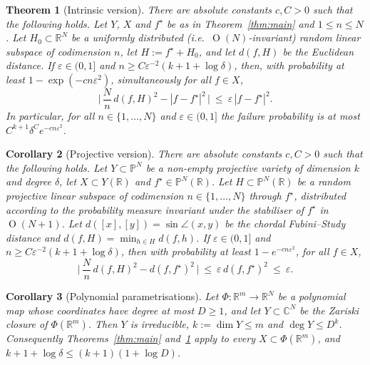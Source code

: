 \documentclass[11pt]{article}
\newtheorem{theorem}{Theorem}[section]
\newtheorem{corollary}[theorem]{Corollary}
\theoremstyle{definition}
\numberwithin{equation}{section}
\newcommand{\R}{\mathbb{R}}
\newcommand{\C}{\mathbb{C}}
\newcommand{\PP}{\mathbb{P}}
\newcommand{\eps}{\varepsilon}
\newcommand{\fs}{f^{\star}}
\DeclareMathOperator{\Ort}{O}
\begin{document}
\begin{theorem}[Intrinsic version]\label{thm:haar}
There are absolute constants $c,C>0$ such that the following holds. Let $Y$, $X$ and $\fs$ be as in Theorem~\ref{thm:main} and $1\le n\le N$. Let $H_0\subset\R^N$ be a uniformly distributed (i.e.\ $\Ort(N)$-invariant) random linear subspace of codimension $n$, let $H:=\fs+H_0$, and let $d(f,H)$ be the Euclidean distance. If $\eps\in(0,1]$ and $n\ge C\eps^{-2}(k+1+\log\delta)$, then, with probability at least $1-\exp(-cn\eps^2)$, simultaneously for all $f\in X$,
\begin{equation}\label{eq:haar}
\Big|\,\frac Nn\,d(f,H)^2-|f-\fs|^2\,\Big|\ \le\ \eps\,|f-\fs|^2 .
\end{equation}
In particular, for all $n\in\{1,\dots,N\}$ and $\eps\in(0,1]$ the failure probability is at most $C^{k+1}\delta^{C}e^{-cn\eps^2}$.
\end{theorem}

\begin{corollary}[Projective version]\label{cor:proj}
There are absolute constants $c,C>0$ such that the following holds. Let $Y\subset\PP^N$ be a non-empty projective variety of dimension $k$ and degree $\delta$, let $X\subset Y(\R)$ and $\fs\in\PP^N(\R)$. Let $H\subset\PP^N(\R)$ be a random projective linear subspace of codimension $n\in\{1,\dots,N\}$ through $\fs$, distributed according to the probability measure invariant under the stabiliser of $\fs$ in $\Ort(N+1)$. Let $d([x],[y])=\sin\angle(x,y)$ be the chordal Fubini--Study distance and $d(f,H)=\min_{h\in H}d(f,h)$. If $\eps\in(0,1]$ and $n\ge C\eps^{-2}(k+1+\log\delta)$, then with probability at least $1-e^{-cn\eps^2}$, for all $f\in X$,
\[
\Big|\,\frac Nn\,d(f,H)^2-d(f,\fs)^2\,\Big|\ \le\ \eps\,d(f,\fs)^2\ \le\ \eps .
\]
\end{corollary}

\begin{corollary}[Polynomial parametrisations]\label{cor:param}
Let $\Phi:\R^m\to\R^N$ be a polynomial map whose coordinates have degree at most $D\ge1$, and let $Y\subset\C^N$ be the Zariski closure of $\Phi(\R^m)$. Then $Y$ is irreducible, $k:=\dim Y\le m$ and $\deg Y\le D^{k}$. Consequently Theorems~\ref{thm:main} and~\ref{thm:haar} apply to every $X\subset\Phi(\R^m)$, and $k+1+\log\delta\le(k+1)(1+\log D)$.
\end{corollary}
\end{document}
